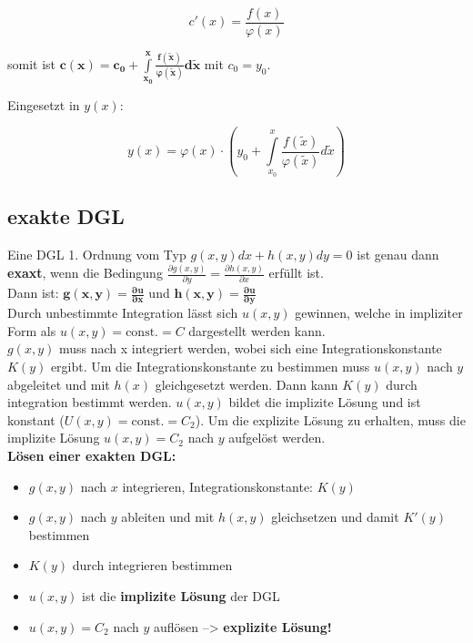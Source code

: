 \[c'(x)=\frac{f(x)}{\varphi(x)}\]

somit ist $\bm{c(x) = c_0 + \int\limits_{x_0}^x\frac{f(\tilde{x})}{\varphi(\tilde{x})}d\tilde{x}}$ mit $c_0 = y_0$. 

Eingesetzt in $y(x)$:

\[
    y(x) = \varphi(x) \cdot \left( y_0+\int\limits_{x_0}^x\frac{f(\tilde{x})}{\varphi(\tilde{x})}d\tilde{x}\right)
\]

\subsection{exakte DGL}
Eine DGL 1. Ordnung vom Typ $g(x,y)dx + h(x,y)dy = 0$ ist genau dann \textbf{exaxt}, wenn die Bedingung $\frac{\partial g(x,y)}{\partial y} = \frac{\partial h (x,y)}{\partial x}$ erfüllt ist.\\

Dann ist: $\bm{g(x,y) = \frac{\partial u}{ \partial x}}$ und $\bm{h(x,y) = \frac{\partial u}{ \partial y}}$\\

Durch unbestimmte Integration lässt sich $u(x,y)$ gewinnen, welche in impliziter Form als $u(x,y) = \text{const.} = C$ dargestellt werden kann.\\

$g(x,y)$ muss nach x integriert werden, wobei sich eine Integrationskonstante $K(y)$ ergibt. Um die Integrationskonstante zu bestimmen muss $u(x,y)$ nach $y$ abgeleitet und mit $h(x)$ gleichgesetzt werden. Dann kann $K(y)$ durch integration bestimmt werden. $u(x,y)$ bildet die implizite Lösung und ist konstant ($U(x,y) = \text{const.} = C_2$). Um die explizite Lösung zu erhalten, muss die implizite Lösung $u(x,y) = C_2$ nach $y$ aufgelöst werden.\\

\textbf{Lösen einer exakten DGL:}
\begin{itemize}
    \item $g(x,y)$ nach $x$ integrieren, Integrationskonstante: $K(y)$
    \item $g(x,y)$ nach $y$ ableiten und mit $h(x,y)$ gleichsetzen und damit $K'(y)$ bestimmen
    \item $K(y)$ durch integrieren bestimmen
    \item $u(x,y)$ ist die \textbf{implizite Lösung} der DGL
    \item $u(x,y) = C_2$ nach $y$ auflösen --> \textbf{explizite Lösung!}
\end{itemize}

